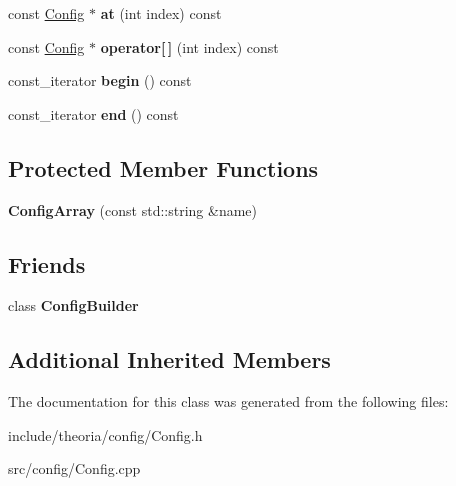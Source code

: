 \begin{DoxyCompactItemize}
\item 
\mbox{\label{classtheoria_1_1config_1_1ConfigArray_a7200bc93265f3b9d9b5ea462fca4a0cb}} 
const \hyperlink{classtheoria_1_1config_1_1Config}{Config} $\ast$ {\bfseries at} (int index) const
\item 
\mbox{\label{classtheoria_1_1config_1_1ConfigArray_a752c88b79f88e9cd5f6a887b1b6ed119}} 
const \hyperlink{classtheoria_1_1config_1_1Config}{Config} $\ast$ {\bfseries operator\mbox{[}$\,$\mbox{]}} (int index) const
\item 
\mbox{\label{classtheoria_1_1config_1_1ConfigArray_a21faee00f3613c6c36a044c7a37de609}} 
const\+\_\+iterator {\bfseries begin} () const
\item 
\mbox{\label{classtheoria_1_1config_1_1ConfigArray_a5fca8609f50e2cfc41d75b0d6891c415}} 
const\+\_\+iterator {\bfseries end} () const
\end{DoxyCompactItemize}
\subsection*{Protected Member Functions}
\begin{DoxyCompactItemize}
\item 
\mbox{\label{classtheoria_1_1config_1_1ConfigArray_a9086dda6fa6d659256f50be797dfe719}} 
{\bfseries Config\+Array} (const std\+::string \&name)
\end{DoxyCompactItemize}
\subsection*{Friends}
\begin{DoxyCompactItemize}
\item 
\mbox{\label{classtheoria_1_1config_1_1ConfigArray_a3d61732fded713b38fc7f9fe3d80e2ae}} 
class {\bfseries Config\+Builder}
\end{DoxyCompactItemize}
\subsection*{Additional Inherited Members}


The documentation for this class was generated from the following files\+:\begin{DoxyCompactItemize}
\item 
include/theoria/config/Config.\+h\item 
src/config/Config.\+cpp\end{DoxyCompactItemize}
